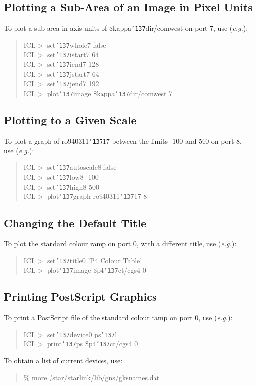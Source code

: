\documentclass[a4paper]{book}
\renewcommand{\_}{{\tt\char'137}}
\begin{document}
\subsection{Plotting a Sub-Area of an Image in Pixel Units}
To plot a sub-area in axis units of {\sc \$kappa\_dir/}comwest on port
7, use ({\em e.g.}):

\begin{quote}
ICL$>$ set\_whole7 false \\
ICL$>$ set\_istart7 64 \\
ICL$>$ set\_iend7 128 \\
ICL$>$ set\_jstart7 64 \\
ICL$>$ set\_jend7 192 \\
ICL$>$ plot\_image {\sc \$kappa\_dir/}comwest 7
\end{quote}

\subsection{Plotting to a Given Scale}
To plot a graph of ro940311\_17 between the limits -100 and 500 on port
8, use ({\em e.g.}):

\begin{quote}
ICL$>$ set\_autoscale8 false \\
ICL$>$ set\_low8 -100 \\
ICL$>$ set\_high8 500 \\
ICL$>$ plot\_graph ro940311\_17 8
\end{quote}
\subsection{Changing the Default Title}
To plot the standard colour ramp on port 0, with a different title, use ({\em e.g.}):
\begin{quote}
ICL$>$ set\_title0 'P4 Colour Table' \\
ICL$>$ plot\_image {\sc \$p4\_ct/}cgs4 0
\end{quote}
\subsection{Printing PostScript Graphics}
To print a PostScript file of the standard colour ramp on port 0, 
use ({\em e.g.}):
\begin{quote}
ICL$>$ set\_device0 ps\_l \\
ICL$>$ print\_ps {\sc \$p4\_ct/}cgs4 0
\end{quote}
To obtain a list of current devices, use:
\begin{quote}
 \% more /star/starlink/lib/gns/gksnames.dat
\end{quote}
\end{document}
